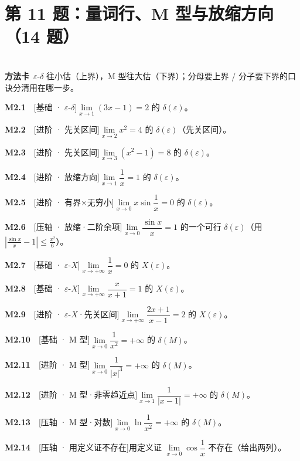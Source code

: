 \documentclass[11pt,a4paper]{ctexart}
\newcommand{\eps}{\varepsilon}
\newcommand{\qi}[3]{\par\noindent\textbf{#1}\ \ {\footnotesize[#2]}\quad #3\par\smallskip}
\begin{document}
\section{第 11 题：量词行、M 型与放缩方向（14 题）}
\\[0.3em]
\noindent\textbf{方法卡}\ $\eps$-$\delta$ 往小估（上界），M 型往大估（下界）；分母要上界 / 分子要下界的口诀分清用在哪一步。\\[0.5em]
\qi{M2.1}{基础 · $\eps$-$\delta$}{$\lim\limits_{x\to1}(3x-1)=2$ 的 $\delta(\eps)$。}
\qi{M2.2}{进阶 · 先关区间}{$\lim\limits_{x\to2}x^{2}=4$ 的 $\delta(\eps)$（先关区间）。}
\qi{M2.3}{进阶 · 先关区间}{$\lim\limits_{x\to3}(x^{2}-1)=8$ 的 $\delta(\eps)$。}
\qi{M2.4}{进阶 · 放缩方向}{$\lim\limits_{x\to1}\dfrac1x=1$ 的 $\delta(\eps)$。}
\qi{M2.5}{进阶 · 有界×无穷小}{$\lim\limits_{x\to0}x\sin\dfrac1x=0$ 的 $\delta(\eps)$。}
\qi{M2.6}{压轴 · 放缩·二阶余项}{$\lim\limits_{x\to0}\dfrac{\sin x}{x}=1$ 的一个可行 $\delta(\eps)$（用 $|\tfrac{\sin x}{x}-1|\le \tfrac{x^{2}}6$）。}
\qi{M2.7}{基础 · $\eps$-$X$}{$\lim\limits_{x\to+\infty}\dfrac1x=0$ 的 $X(\eps)$。}
\qi{M2.8}{基础 · $\eps$-$X$}{$\lim\limits_{x\to+\infty}\dfrac{x}{x+1}=1$ 的 $X(\eps)$。}
\qi{M2.9}{进阶 · $\eps$-$X$·先关区间}{$\lim\limits_{x\to+\infty}\dfrac{2x+1}{x-1}=2$ 的 $X(\eps)$。}
\qi{M2.10}{基础 · M 型}{$\lim\limits_{x\to0}\dfrac1{x^{2}}=+\infty$ 的 $\delta(M)$。}
\qi{M2.11}{进阶 · M 型}{$\lim\limits_{x\to0}\dfrac1{|x|^{3}}=+\infty$ 的 $\delta(M)$。}
\qi{M2.12}{进阶 · M 型·非零趋近点}{$\lim\limits_{x\to1}\dfrac1{|x-1|}=+\infty$ 的 $\delta(M)$。}
\qi{M2.13}{压轴 · M 型·对数}{$\lim\limits_{x\to0}\ln\dfrac1{x^{2}}=+\infty$ 的 $\delta(M)$。}
\qi{M2.14}{压轴 · 用定义证不存在}{用定义证 $\lim\limits_{x\to0}\cos\dfrac1x$ 不存在（给出两列）。}
\end{document}
